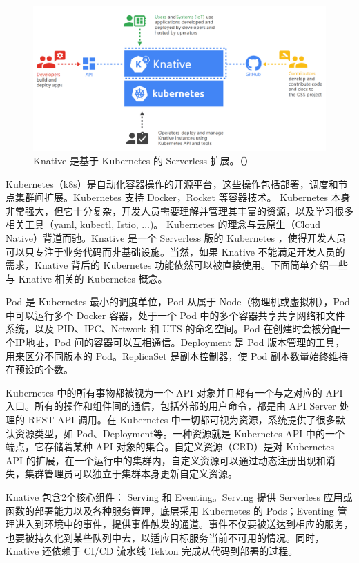 \documentclass[11pt]{article}
\begin{document}
\begin{figure}[!htbp]
	\centering
	\includegraphics[width=1.0\linewidth]{figs/knative-audience}
	\caption{Knative 是基于 Kubernetes 的 Serverless 扩展。（\cite{knative-audiance}）}
	\label{figs:knative-audience}
\end{figure}


Kubernetes（k8s）是自动化容器操作的开源平台，这些操作包括部署，调度和节点集群间扩展。Kubernetes 支持 Docker，Rocket 等容器技术。 Kubernetes 本身非常强大，但它十分复杂，开发人员需要理解并管理其丰富的资源，以及学习很多相关工具（yaml, kubectl, Istio, ...)。 Kubernetes 的理念与云原生（Cloud Native）背道而驰。Knative 是一个 Serverless 版的 Kubernetes ，使得开发人员可以只专注于业务代码而非基础设施。当然，如果 Knative 不能满足开发人员的需求，Knative 背后的 Kubernetes 功能依然可以被直接使用。下面简单介绍一些与 Knative 相关的 Kubernetes 概念。


Pod 是 Kubernetes 最小的调度单位，Pod 从属于 Node（物理机或虚拟机），Pod 中可以运行多个 Docker 容器，处于一个 Pod 中的多个容器共享共享网络和文件系统，以及 PID、IPC、Network 和 UTS 的命名空间\cite{k8s-pod}。Pod 在创建时会被分配一个IP地址，Pod 间的容器可以互相通信。Deployment 是 Pod 版本管理的工具，用来区分不同版本的 Pod。ReplicaSet 是副本控制器，使 Pod 副本数量始终维持在预设的个数。


Kubernetes 中的所有事物都被视为一个 API 对象并且都有一个与之对应的 API 入口。所有的操作和组件间的通信，包括外部的用户命令，都是由 API Server 处理的 REST API 调用。在 Kubernetes 中一切都可视为资源，系统提供了很多默认资源类型，如 Pod、Deployment等。一种资源就是 Kubernetes API 中的一个端点，它存储着某种 API 对象的集合。自定义资源（CRD）是对 Kubernetes API 的扩展，在一个运行中的集群内，自定义资源可以通过动态注册出现和消失，集群管理员可以独立于集群本身更新自定义资源\cite{k8s-CRD}。


Knative 包含2个核心组件： Serving 和 Eventing。Serving 提供 Serverless 应用或函数的部署能力以及各种服务管理，底层采用 Kubernetes 的 Pods；Eventing 管理进入到环境中的事件，提供事件触发的通道。事件不仅要被送达到相应的服务，也要被持久化到某些队列中去，以适应目标服务当前不可用的情况。同时，Knative 还依赖于 CI/CD 流水线 Tekton 完成从代码到部署的过程。
\end{document}

